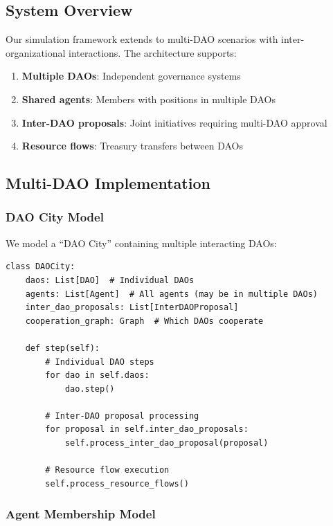 
\subsection{System Overview}

Our simulation framework extends to multi-DAO scenarios with inter-organizational interactions. The architecture supports:

\begin{enumerate}
    \item \textbf{Multiple DAOs}: Independent governance systems
    \item \textbf{Shared agents}: Members with positions in multiple DAOs
    \item \textbf{Inter-DAO proposals}: Joint initiatives requiring multi-DAO approval
    \item \textbf{Resource flows}: Treasury transfers between DAOs
\end{enumerate}

\subsection{Multi-DAO Implementation}

\subsubsection{DAO City Model}

We model a ``DAO City'' containing multiple interacting DAOs:

\begin{lstlisting}[caption=DAO City model (pseudocode)]
class DAOCity:
    daos: List[DAO]  # Individual DAOs
    agents: List[Agent]  # All agents (may be in multiple DAOs)
    inter_dao_proposals: List[InterDAOProposal]
    cooperation_graph: Graph  # Which DAOs cooperate

    def step(self):
        # Individual DAO steps
        for dao in self.daos:
            dao.step()

        # Inter-DAO proposal processing
        for proposal in self.inter_dao_proposals:
            self.process_inter_dao_proposal(proposal)

        # Resource flow execution
        self.process_resource_flows()
\end{lstlisting}

\subsubsection{Agent Membership Model}

